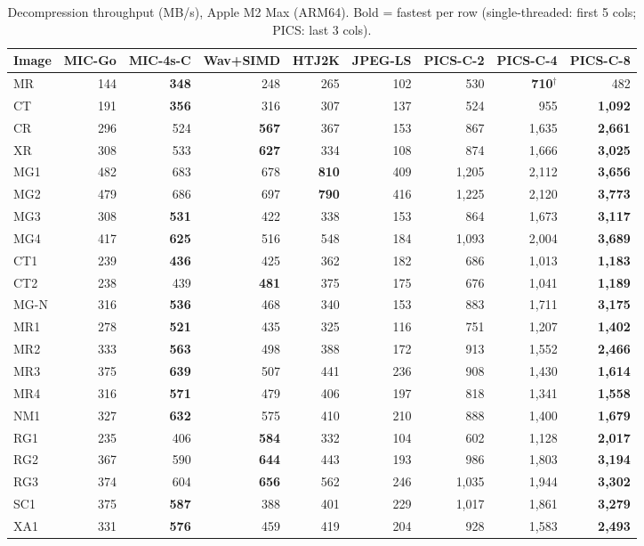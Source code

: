 \documentclass[journal]{IEEEtran}
\begin{document}
\begin{table}[t]
\centering
\caption{Decompression throughput (MB/s), Apple M2 Max (ARM64). Bold = fastest
per row (single-threaded: first 5 cols; PICS: last 3 cols).}
\label{tab:decomp-arm}
\scriptsize
\begin{tabular}{lrrrrrrrr}
\toprule
Image & MIC-Go & MIC-4s-C & Wav+SIMD & HTJ2K & JPEG-LS & PICS-C-2 & PICS-C-4 & PICS-C-8 \\
\midrule
MR   & 144 & \textbf{348} & 248 & 265 & 102 & 530 & \textbf{710}$^\dagger$ & 482 \\
CT   & 191 & \textbf{356} & 316 & 307 & 137 & 524 & 955 & \textbf{1,092} \\
CR   & 296 & 524 & \textbf{567} & 367 & 153 & 867 & 1,635 & \textbf{2,661} \\
XR   & 308 & 533 & \textbf{627} & 334 & 108 & 874 & 1,666 & \textbf{3,025} \\
MG1  & 482 & 683 & 678 & \textbf{810} & 409 & 1,205 & 2,112 & \textbf{3,656} \\
MG2  & 479 & 686 & 697 & \textbf{790} & 416 & 1,225 & 2,120 & \textbf{3,773} \\
MG3  & 308 & \textbf{531} & 422 & 338 & 153 & 864 & 1,673 & \textbf{3,117} \\
MG4  & 417 & \textbf{625} & 516 & 548 & 184 & 1,093 & 2,004 & \textbf{3,689} \\
CT1  & 239 & \textbf{436} & 425 & 362 & 182 & 686 & 1,013 & \textbf{1,183} \\
CT2  & 238 & 439 & \textbf{481} & 375 & 175 & 676 & 1,041 & \textbf{1,189} \\
MG-N & 316 & \textbf{536} & 468 & 340 & 153 & 883 & 1,711 & \textbf{3,175} \\
MR1  & 278 & \textbf{521} & 435 & 325 & 116 & 751 & 1,207 & \textbf{1,402} \\
MR2  & 333 & \textbf{563} & 498 & 388 & 172 & 913 & 1,552 & \textbf{2,466} \\
MR3  & 375 & \textbf{639} & 507 & 441 & 236 & 908 & 1,430 & \textbf{1,614} \\
MR4  & 316 & \textbf{571} & 479 & 406 & 197 & 818 & 1,341 & \textbf{1,558} \\
NM1  & 327 & \textbf{632} & 575 & 410 & 210 & 888 & 1,400 & \textbf{1,679} \\
RG1  & 235 & 406 & \textbf{584} & 332 & 104 & 602 & 1,128 & \textbf{2,017} \\
RG2  & 367 & 590 & \textbf{644} & 443 & 193 & 986 & 1,803 & \textbf{3,194} \\
RG3  & 374 & 604 & \textbf{656} & 562 & 246 & 1,035 & 1,944 & \textbf{3,302} \\
SC1  & 375 & \textbf{587} & 388 & 401 & 229 & 1,017 & 1,861 & \textbf{3,279} \\
XA1  & 331 & \textbf{576} & 459 & 419 & 204 & 928 & 1,583 & \textbf{2,493} \\
\bottomrule
\end{tabular}
\end{table}
\end{document}
